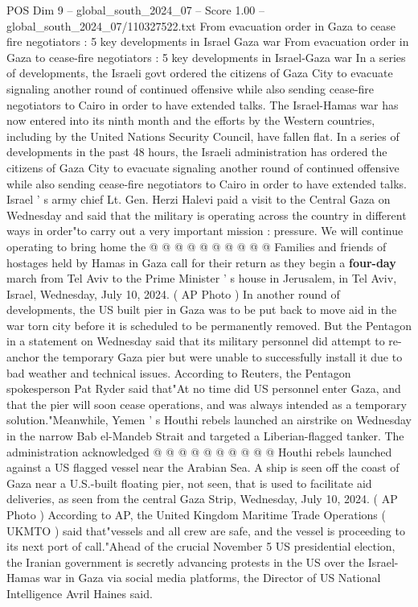 \begin{textsample}{POS Dim 9 – global\_south\_2024\_07 – Score 1.00 – global\_south\_2024\_07/110327522.txt}  \label{ex:f9_pos_110}
From evacuation order in Gaza to cease fire negotiators : 5 key developments in Israel Gaza war From evacuation order in Gaza to cease-fire negotiators : 5 key developments in Israel-Gaza war In a series of developments, the Israeli govt ordered the citizens of Gaza City to evacuate signaling another round of continued offensive while also sending cease-fire negotiators to Cairo in order to have extended talks.
The Israel-Hamas war has now entered into its ninth month and the efforts by the Western countries, including by the United Nations Security Council, have fallen flat.
In a series of developments in the past 48 hours, the Israeli administration has ordered the citizens of Gaza City to evacuate signaling another round of continued offensive while also sending cease-fire negotiators to Cairo in order to have extended talks.
Israel ' s army chief Lt.
Gen.
Herzi Halevi paid a visit to the Central Gaza on Wednesday and said that the military is operating across the country in different ways in order"to carry out a very important mission : pressure.
We will continue operating to bring home the @ @ @ @ @ @ @ @ @ @ Families and friends of hostages held by Hamas in Gaza call for their return as they begin a \textbf{four-day} march from Tel Aviv to the Prime Minister ' s house in Jerusalem, in Tel Aviv, Israel, Wednesday, July 10, 2024. ( AP Photo ) In another round of developments, the US built pier in Gaza was to be put back to move aid in the war torn city before it is scheduled to be permanently removed.
But the Pentagon in a statement on Wednesday said that its military personnel did attempt to re-anchor the temporary Gaza pier but were unable to successfully install it due to bad weather and technical issues.
According to Reuters, the Pentagon spokesperson Pat Ryder said that"At no time did US personnel enter Gaza, and that the pier will soon cease operations, and was always intended as a temporary solution."Meanwhile, Yemen ' s Houthi rebels launched an airstrike on Wednesday in the narrow Bab el-Mandeb Strait and targeted a Liberian-flagged tanker.
The administration acknowledged @ @ @ @ @ @ @ @ @ @ Houthi rebels launched against a US flagged vessel near the Arabian Sea.
A ship is seen off the coast of Gaza near a U.S.-built floating pier, not seen, that is used to facilitate aid deliveries, as seen from the central Gaza Strip, Wednesday, July 10, 2024. ( AP Photo ) According to AP, the United Kingdom Maritime Trade Operations ( UKMTO ) said that"vessels and all crew are safe, and the vessel is proceeding to its next port of call."Ahead of the crucial November 5 US presidential election, the Iranian government is secretly advancing protests in the US over the Israel-Hamas war in Gaza via social media platforms, the Director of US National Intelligence Avril Haines said.

\end{textsample}
